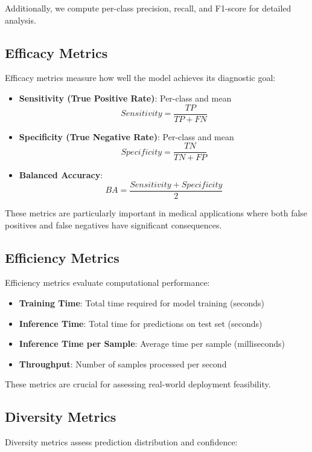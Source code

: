 \documentclass[runningheads]{llncs}
\begin{document}
Additionally, we compute per-class precision, recall, and F1-score for detailed analysis.

\subsection{Efficacy Metrics}

Efficacy metrics measure how well the model achieves its diagnostic goal:

\begin{itemize}
    \item \textbf{Sensitivity (True Positive Rate)}: Per-class and mean
    $$Sensitivity = \frac{TP}{TP + FN}$$
    \item \textbf{Specificity (True Negative Rate)}: Per-class and mean
    $$Specificity = \frac{TN}{TN + FP}$$
    \item \textbf{Balanced Accuracy}: 
    $$BA = \frac{Sensitivity + Specificity}{2}$$
\end{itemize}

These metrics are particularly important in medical applications where both false positives and false negatives have significant consequences.

\subsection{Efficiency Metrics}

Efficiency metrics evaluate computational performance:

\begin{itemize}
    \item \textbf{Training Time}: Total time required for model training (seconds)
    \item \textbf{Inference Time}: Total time for predictions on test set (seconds)
    \item \textbf{Inference Time per Sample}: Average time per sample (milliseconds)
    \item \textbf{Throughput}: Number of samples processed per second
\end{itemize}

These metrics are crucial for assessing real-world deployment feasibility.

\subsection{Diversity Metrics}

Diversity metrics assess prediction distribution and confidence:
\end{document}
